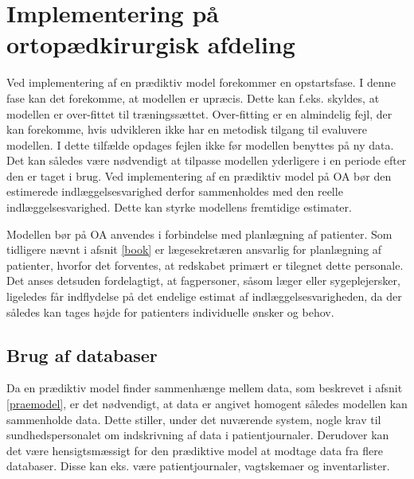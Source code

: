 \section{Implementering på ortopædkirurgisk afdeling}
Ved implementering af en prædiktiv model forekommer en opstartsfase. I denne fase kan det forekomme, at modellen er upræcis. Dette kan f.eks. skyldes, at modellen er over-fittet til træningssættet. Over-fitting er en almindelig fejl, der kan forekomme, hvis udvikleren ikke har en metodisk tilgang til evaluvere modellen. I dette tilfælde opdages fejlen ikke før modellen benyttes på ny data.  
Det kan således være nødvendigt at tilpasse modellen yderligere i en periode efter den er taget i brug.\cite{Kuhn2013} Ved implementering af en prædiktiv model på OA bør den estimerede indlæggelsesvarighed derfor sammenholdes med den reelle indlæggelsesvarighed. Dette kan styrke modellens fremtidige estimater.

Modellen bør på OA anvendes i forbindelse med planlægning af patienter. Som tidligere nævnt i afsnit \ref{book} er lægesekretæren ansvarlig for planlægning af patienter, hvorfor det forventes, at redskabet primært er tilegnet dette personale. Det anses detsuden fordelagtigt, at fagpersoner, såsom læger eller sygeplejersker, ligeledes får indflydelse på det endelige estimat af indlæggelsesvarigheden, da der således kan tages højde for patienters individuelle ønsker og behov.




\subsection{Brug af databaser}
Da en prædiktiv model finder sammenhænge mellem data, som beskrevet i afsnit \ref{praemodel}, er det nødvendigt, at data er angivet homogent således modellen kan sammenholde data\cite{Kuhn2013}. 
Dette stiller, under det nuværende system, nogle krav til sundhedspersonalet om indskrivning af data i patientjournaler. Derudover kan det være hensigtsmæssigt for den prædiktive model at modtage data fra flere databaser. Disse kan eks. være patientjournaler, vagtskemaer og inventarlister.



